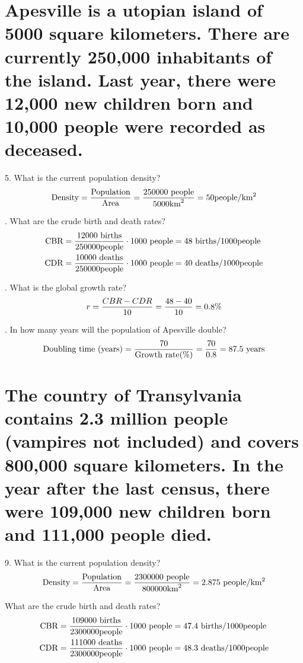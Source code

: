 \documentclass[11pt]{article}
\newcommand*{\vs}{\vspace{1cm}}
\newcommand*{\next}{\noindent}
\newcommand*{\set}{\setcounter{equation}{0}}
\begin{document}
\section{Apesville is a utopian island of 5000 square kilometers.  There are currently 250,000 inhabitants of the island.  Last year, there were 12,000 new children born and 10,000 people were recorded as deceased.}
5. What is the current population density?
\begin{align}
    \set
    \text{Density}=\frac{\text{Population}}{\text{Area}}=\frac{250000\,\,\text{people}}{5000\text{km}^2}=50\text{people}/\text{km}^2
\end{align}

\vs
\next
6. What are the crude birth and death rates?
\begin{align}
    \set
    \text{CBR}&=\frac{12000\,\,\text{births}}{250000 \text{people}}\cdot 1000\,\,\text{people}=48\,\,\text{births}/1000\text{people}\\
    \text{CDR}&=\frac{10000\,\,\text{deaths}}{250000 \text{people}}\cdot 1000\,\,\text{people}=40\,\,\text{deaths}/1000\text{people}
\end{align}

\vs
\next
7. What is the global growth rate?
\begin{align}
    \set
    r=\frac{CBR-CDR}{10}=\frac{48-40}{10}=0.8\%
\end{align}

\vs
\next
8. In how many years will the population of Apesville double?
\begin{align}
    \set
    \text{Doubling time (years)}=\frac{70}{\text{Growth rate(\%)}}=\frac{70}{0.8}=87.5\,\,\text{years}
\end{align}

\section{The country of Transylvania contains 2.3 million people (vampires not included) and covers 800,000 square kilometers.  In the year after the last census, there were 109,000 new children born and 111,000 people died.}
9. What is the current population density?
\begin{align}
    \set
    \text{Density}=\frac{\text{Population}}{\text{Area}}=\frac{2300000\,\,\text{people}}{800000\text{km}^2}=2.875\,\,\text{people}/\text{km}^2
\end{align}

\vs
\next
10 What are the crude birth and death rates?
\begin{align}
    \set
    \text{CBR}&=\frac{109000\,\,\text{births}}{2300000 \text{people}}\cdot 1000\,\,\text{people}=47.4\,\,\text{births}/1000\text{people}\\
    \text{CDR}&=\frac{111000\,\,\text{deaths}}{2300000 \text{people}}\cdot 1000\,\,\text{people}=48.3\,\,\text{deaths}/1000\text{people}
\end{align}
\end{document}
